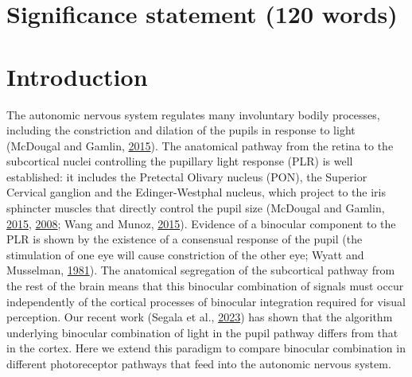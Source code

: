 \documentclass[
]{article}
\begin{document}
\hypertarget{significance-statement-120-words}{%
\section{Significance statement (120 words)}\label{significance-statement-120-words}}

\hypertarget{introduction}{%
\section{Introduction}\label{introduction}}

The autonomic nervous system regulates many involuntary bodily processes, including the constriction and dilation of the pupils in response to light (McDougal and Gamlin, \protect\hyperlink{ref-McDougal2015}{2015}). The anatomical pathway from the retina to the subcortical nuclei controlling the pupillary light response (PLR) is well established: it includes the Pretectal Olivary nucleus (PON), the Superior Cervical ganglion and the Edinger-Westphal nucleus, which project to the iris sphincter muscles that directly control the pupil size (McDougal and Gamlin, \protect\hyperlink{ref-McDougal2015}{2015}, \protect\hyperlink{ref-McDougal2008}{2008}; Wang and Munoz, \protect\hyperlink{ref-Wang2015}{2015}). Evidence of a binocular component to the PLR is shown by the existence of a consensual response of the pupil (the stimulation of one eye will cause constriction of the other eye; Wyatt and Musselman, \protect\hyperlink{ref-Wyatt1981}{1981}). The anatomical segregation of the subcortical pathway from the rest of the brain means that this binocular combination of signals must occur independently of the cortical processes of binocular integration required for visual perception. Our recent work (Segala et al., \protect\hyperlink{ref-Segala2023}{2023}) has shown that the algorithm underlying binocular combination of light in the pupil pathway differs from that in the cortex. Here we extend this paradigm to compare binocular combination in different photoreceptor pathways that feed into the autonomic nervous system.
\end{document}
